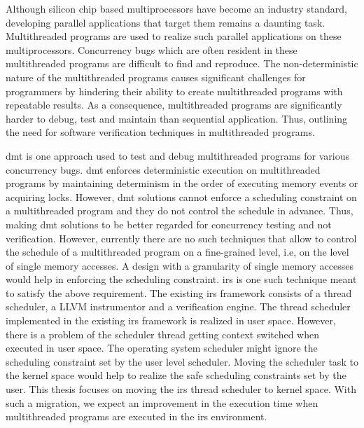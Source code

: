 Although silicon chip based multiprocessors have become an industry standard, developing parallel applications that target them remains a daunting task. 
Multithreaded programs are used to realize such parallel applications on these multiprocessors.
Concurrency bugs which are often resident in these multithreaded programs are difficult to find and reproduce.  
The non-deterministic nature of the multithreaded programs causes significant challenges for programmers by hindering their ability to create multithreaded programs with repeatable results. 
As a consequence, multithreaded programs are significantly harder to debug, test and maintain than sequential application. 
Thus, outlining the need for software verification techniques in multithreaded programs. 

\acrfull{dmt} is one approach used to test and debug multithreaded programs for various concurrency bugs. 
\acrshort{dmt} enforces deterministic execution on multithreaded programs by maintaining determinism in the order of executing memory events or acquiring locks. 
However, \acrshort{dmt} solutions cannot enforce a scheduling constraint on a multithreaded program and they do not control the schedule in advance. 
Thus, making \acrshort{dmt} solutions to be better regarded for concurrency testing and not verification. 
However, currently there are no such techniques that allow to control the schedule of a multithreaded program on a fine-grained level, i.e, on the level of single memory accesses. 
A design with a granularity of single memory accesses would help in enforcing the scheduling constraint. 
\acrfull{irs} is one such technique meant to satisfy the above requirement. 
The existing \acrshort{irs} framework consists of a thread scheduler, a LLVM instrumentor and a verification engine.  
The thread scheduler implemented in the existing \acrshort{irs} framework is realized in user space. 
However, there is a problem of the scheduler thread getting context switched when executed in user space. 
The operating system scheduler might ignore the scheduling constraint set by the user level scheduler. 
Moving the scheduler task to the kernel space would help to realize the safe scheduling constraints set by the user. 
This thesis focuses on moving the \acrshort{irs} thread scheduler to kernel space. 
With such a migration, we expect an improvement in the execution time when multithreaded programs are executed in the \acrshort{irs} environment.


